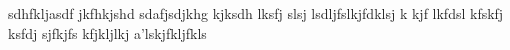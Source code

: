 sdhfkljasdf jkfhkjshd sdafjsdjkhg kjksdh lksfj slsj lsdljfslkjfdklsj k kjf lkfdsl kfskfj ksfdj sjfkjfs kfjkljlkj a'lskjfkljfkls
